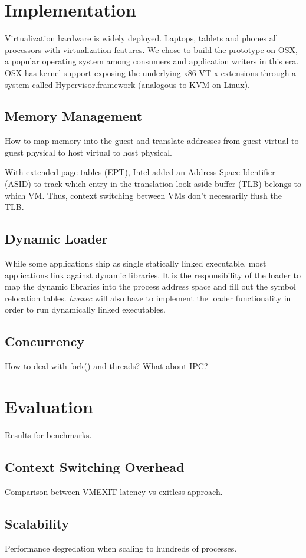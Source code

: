 \documentclass{article}
\newcommand{\PROJNAME}{\textit{hvexec}}
\begin{document}
\section{Implementation}
Virtualization hardware is widely deployed. Laptops, tablets and phones all processors with virtualization features.
We chose to build the prototype on OSX, a popular operating system among consumers and application writers in this era.
OSX has kernel support exposing the underlying x86 VT-x extensions through a system called Hypervisor.framework (analogous to KVM on Linux).
\subsection{Memory Management}
How to map memory into the guest and translate addresses from guest virtual to guest physical to host virtual to host physical.

With extended page tables (EPT), Intel added an Address Space Identifier (ASID) to
track which entry in the translation look aside buffer (TLB) belongs to which VM. Thus, context switching between
VMs don't necessarily flush the TLB.
\subsection{Dynamic Loader}
While some applications ship as single statically linked executable, most applications link against dynamic libraries.
It is the responsibility of the loader to map the dynamic libraries into the process address space and fill out the
symbol relocation tables.
\PROJNAME{} will also have to implement the loader functionality in order to run dynamically linked executables.
\subsection{Concurrency}
How to deal with fork() and threads? What about IPC?

\section{Evaluation}
Results for benchmarks.
\subsection{Context Switching Overhead}
Comparison between VMEXIT latency vs exitless approach.
\subsection{Scalability}
Performance degredation when scaling to hundreds of processes.
\end{document}
